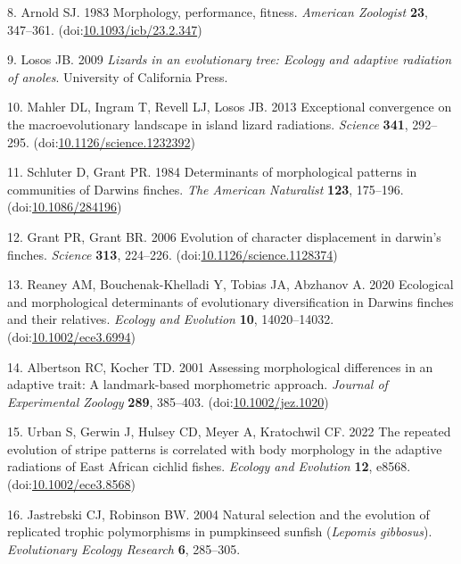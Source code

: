 \documentclass[
  11pt,
]{article}
\begin{document}
\leavevmode\hypertarget{ref-Arnold1983}{}%
8. Arnold SJ. 1983 Morphology, performance, fitness. \emph{American
Zoologist} \textbf{23}, 347--361.
(doi:\href{https://doi.org/10.1093/icb/23.2.347}{10.1093/icb/23.2.347})

\leavevmode\hypertarget{ref-Losos2009}{}%
9. Losos JB. 2009 \emph{Lizards in an evolutionary tree: Ecology and
adaptive radiation of anoles}. University of California Press.

\leavevmode\hypertarget{ref-Mahler2013}{}%
10. Mahler DL, Ingram T, Revell LJ, Losos JB. 2013 Exceptional
convergence on the macroevolutionary landscape in island lizard
radiations. \emph{Science} \textbf{341}, 292--295.
(doi:\href{https://doi.org/10.1126/science.1232392}{10.1126/science.1232392})

\leavevmode\hypertarget{ref-Schluter1984}{}%
11. Schluter D, Grant PR. 1984 Determinants of morphological patterns in
communities of Darwins finches. \emph{The American Naturalist}
\textbf{123}, 175--196.
(doi:\href{https://doi.org/10.1086/284196}{10.1086/284196})

\leavevmode\hypertarget{ref-Grant2006}{}%
12. Grant PR, Grant BR. 2006 Evolution of character displacement in
darwin's finches. \emph{Science} \textbf{313}, 224--226.
(doi:\href{https://doi.org/10.1126/science.1128374}{10.1126/science.1128374})

\leavevmode\hypertarget{ref-Reaney2020}{}%
13. Reaney AM, Bouchenak-Khelladi Y, Tobias JA, Abzhanov A. 2020
Ecological and morphological determinants of evolutionary
diversification in Darwins finches and their relatives. \emph{Ecology
and Evolution} \textbf{10}, 14020--14032.
(doi:\href{https://doi.org/10.1002/ece3.6994}{10.1002/ece3.6994})

\leavevmode\hypertarget{ref-Albertson2001}{}%
14. Albertson RC, Kocher TD. 2001 Assessing morphological differences in
an adaptive trait: A landmark-based morphometric approach. \emph{Journal
of Experimental Zoology} \textbf{289}, 385--403.
(doi:\href{https://doi.org/10.1002/jez.1020}{10.1002/jez.1020})

\leavevmode\hypertarget{ref-Urban2022}{}%
15. Urban S, Gerwin J, Hulsey CD, Meyer A, Kratochwil CF. 2022 The
repeated evolution of stripe patterns is correlated with body morphology
in the adaptive radiations of East African cichlid fishes. \emph{Ecology
and Evolution} \textbf{12}, e8568.
(doi:\href{https://doi.org/10.1002/ece3.8568}{10.1002/ece3.8568})

\leavevmode\hypertarget{ref-Jastrebski2004}{}%
16. Jastrebski CJ, Robinson BW. 2004 Natural selection and the evolution
of replicated trophic polymorphisms in pumpkinseed sunfish
(\emph{Lepomis gibbosus}). \emph{Evolutionary Ecology Research}
\textbf{6}, 285--305.
\end{document}
